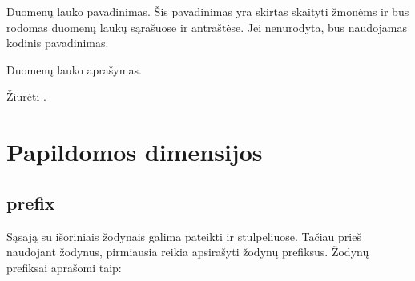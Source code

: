 \documentclass[letterpaper,10pt,lithuanian]{sphinxmanual}
\begin{document}

\begin{fulllineitems}
\label{\detokenize{dimensijos:property.title}}
\pysigstartsignatures
\pysigline
{}
\pysigstopsignatures
\sphinxAtStartPar
Duomenų lauko pavadinimas. Šis pavadinimas yra skirtas skaityti žmonėms
ir bus rodomas duomenų laukų sąrašuose ir antraštėse. Jei nenurodyta, bus
naudojamas {\hyperref[\detokenize{formatas:property}]{}} kodinis pavadinimas.

\end{fulllineitems}


\begin{fulllineitems}
\label{\detokenize{dimensijos:property.description}}
\pysigstartsignatures
\pysigline
{}
\pysigstopsignatures
\sphinxAtStartPar
Duomenų lauko aprašymas.

\end{fulllineitems}


\begin{fulllineitems}
\label{\detokenize{dimensijos:property.enum}}
\pysigstartsignatures
\pysigline
{}
\pysigstopsignatures
\sphinxAtStartPar
Žiūrėti {\hyperref[\detokenize{dimensijos:enum}]{}}.

\end{fulllineitems}



\section{Papildomos dimensijos}
\label{\detokenize{dimensijos:papildomos-dimensijos}}\label{\detokenize{dimensijos:id8}}

\subsection{prefix}
\label{\detokenize{dimensijos:prefix}}\label{\detokenize{dimensijos:id9}}\label{\detokenize{dimensijos:module-prefix}}
\sphinxAtStartPar
Sąsają su išoriniais žodynais galima pateikti {\hyperref[\detokenize{dimensijos:model.uri}]{}} ir
{\hyperref[\detokenize{dimensijos:property.uri}]{}} stulpeliuose. Tačiau prieš naudojant žodynus, pirmiausia
reikia apsirašyti žodynų prefiksus. Žodynų prefiksai aprašomi taip:
\end{document}
